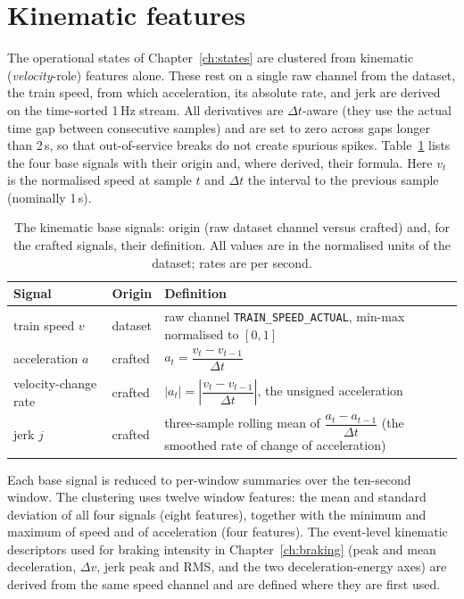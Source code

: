 \section{Kinematic features}
\label{app:kinematics}

The operational states of Chapter~\ref{ch:states} are clustered from kinematic
(\emph{velocity}-role) features alone. These rest on a single raw channel from the dataset,
the train speed, from which acceleration, its absolute rate, and jerk are derived on the
time-sorted 1\,Hz stream. All derivatives are $\Delta t$-aware (they use the actual time gap
between consecutive samples) and are set to zero across gaps longer than 2\,s, so that
out-of-service breaks do not create spurious spikes. Table~\ref{tab:kinematics} lists the four
base signals with their origin and, where derived, their formula. Here $v_t$ is the normalised
speed at sample $t$ and $\Delta t$ the interval to the previous sample (nominally 1\,s).

\begin{table}[htbp]
  \centering
  \caption{The kinematic base signals: origin (raw dataset channel versus crafted) and, for the
  crafted signals, their definition. All values are in the normalised units of the dataset;
  rates are per second.}
  \label{tab:kinematics}
  \begin{tabularx}{\linewidth}{l l >{\RaggedRight}X}
    \toprule
    Signal & Origin & Definition \\
    \midrule
    train speed $v$ & dataset & raw channel \texttt{TRAIN\_SPEED\_ACTUAL}, min-max normalised
      to $[0,1]$ \\[0.6ex]
    acceleration $a$ & crafted & $a_t = \dfrac{v_t - v_{t-1}}{\Delta t}$ \\[1.2ex]
    velocity-change rate & crafted & $\left| a_t \right| = \left| \dfrac{v_t - v_{t-1}}{\Delta t}
      \right|$, the unsigned acceleration \\[1.2ex]
    jerk $j$ & crafted & three-sample rolling mean of $\dfrac{a_t - a_{t-1}}{\Delta t}$
      (the smoothed rate of change of acceleration) \\
    \bottomrule
  \end{tabularx}
\end{table}

Each base signal is reduced to per-window summaries over the ten-second window. The clustering
uses twelve window features: the mean and standard deviation of all four signals (eight
features), together with the minimum and maximum of speed and of acceleration (four features).
The event-level kinematic descriptors used for braking intensity in Chapter~\ref{ch:braking}
(peak and mean deceleration, $\Delta v$, jerk peak and RMS, and the two deceleration-energy
axes) are derived from the same speed channel and are defined where they are first used.